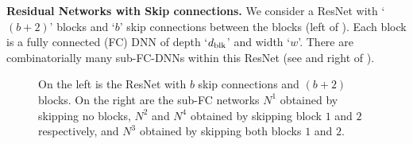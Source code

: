 \textbf{Residual Networks with Skip connections.} We consider a ResNet with `$(b+2)$' blocks and `$b$' skip connections between the blocks (left of ). Each block is a fully connected (FC) DNN of depth `$d_{\text{blk}}$' and width `$w$'. There are combinatorially many sub-FC-DNNs within this ResNet (see  and right of ).
\FloatBarrier
\begin{figure}[h]
\begin{minipage}{0.5\columnwidth}
\end{minipage}
\begin{minipage}{0.5\columnwidth}
\end{minipage}
\caption{\small{On the left is the ResNet with $b$ skip connections and $(b+2)$ blocks. On the right are the sub-FC networks $N^1$ obtained by skipping no blocks, $N^2$ and $N^4$ obtained by skipping block $1$ and $2$ respectively, and $N^3$ obtained by skipping both blocks $1$ and $2$.}}
\label{fig:resnet}
\end{figure}

